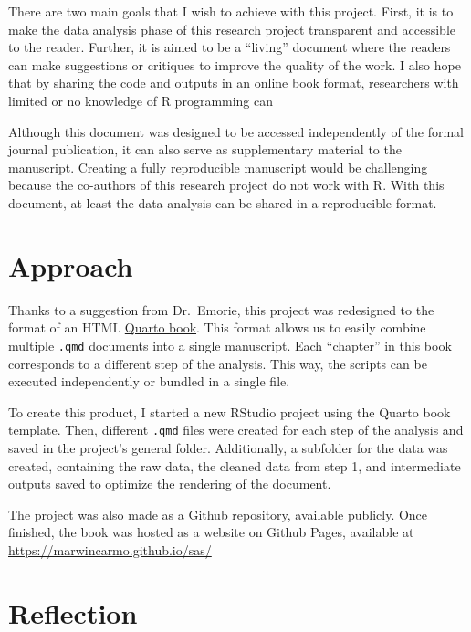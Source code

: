 \documentclass[
  letterpaper,
  DIV=11,
  numbers=noendperiod]{scrreprt}
\begin{document}

There are two main goals that I wish to achieve with this project.
First, it is to make the data analysis phase of this research project
transparent and accessible to the reader. Further, it is aimed to be a
``living'' document where the readers can make suggestions or critiques
to improve the quality of the work. I also hope that by sharing the code
and outputs in an online book format, researchers with limited or no
knowledge of R programming can

Although this document was designed to be accessed independently of the
formal journal publication, it can also serve as supplementary material
to the manuscript. Creating a fully reproducible manuscript would be
challenging because the co-authors of this research project do not work
with R. With this document, at least the data analysis can be shared in
a reproducible format.

\hypertarget{approach}{%
\section*{Approach}\label{approach}}


Thanks to a suggestion from Dr.~Emorie, this project was redesigned to
the format of an HTML \href{https://quarto.org/docs/books/}{Quarto
book}. This format allows us to easily combine multiple \texttt{.qmd}
documents into a single manuscript. Each ``chapter'' in this book
corresponds to a different step of the analysis. This way, the scripts
can be executed independently or bundled in a single file.

To create this product, I started a new RStudio project using the Quarto
book template. Then, different \texttt{.qmd} files were created for each
step of the analysis and saved in the project's general folder.
Additionally, a subfolder for the data was created, containing the raw
data, the cleaned data from step 1, and intermediate outputs saved to
optimize the rendering of the document.

The project was also made as a
\href{https://github.com/marwincarmo/sas}{Github repository}, available
publicly. Once finished, the book was hosted as a website on Github
Pages, available at \url{https://marwincarmo.github.io/sas/}

\hypertarget{reflection}{%
\section*{Reflection}\label{reflection}}
\end{document}
